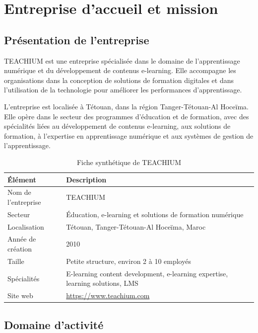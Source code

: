 \documentclass[12pt,a4paper]{report}
\begin{document}
\chapter{Entreprise d'accueil et mission}

\section{Présentation de l'entreprise}

TEACHIUM est une entreprise spécialisée dans le domaine de l'apprentissage numérique et du développement de contenus e-learning. Elle accompagne les organisations dans la conception de solutions de formation digitales et dans l'utilisation de la technologie pour améliorer les performances d'apprentissage.

L'entreprise est localisée à Tétouan, dans la région Tanger-Tétouan-Al Hoceïma. Elle opère dans le secteur des programmes d'éducation et de formation, avec des spécialités liées au développement de contenus e-learning, aux solutions de formation, à l'expertise en apprentissage numérique et aux systèmes de gestion de l'apprentissage.

\begin{table}[H]
\centering
\caption{Fiche synthétique de TEACHIUM}
\begin{tabular}{|p{5cm}|p{9cm}|}
\hline
\textbf{Élément} & \textbf{Description} \\
\hline
Nom de l'entreprise & TEACHIUM \\
\hline
Secteur & Éducation, e-learning et solutions de formation numérique \\
\hline
Localisation & Tétouan, Tanger-Tétouan-Al Hoceïma, Maroc \\
\hline
Année de création & 2010 \\
\hline
Taille & Petite structure, environ 2 à 10 employés \\
\hline
Spécialités & E-learning content development, e-learning expertise, learning solutions, LMS \\
\hline
Site web & \url{https://www.teachium.com} \\
\hline
\end{tabular}
\end{table}

\section{Domaine d'activité}
\end{document}
